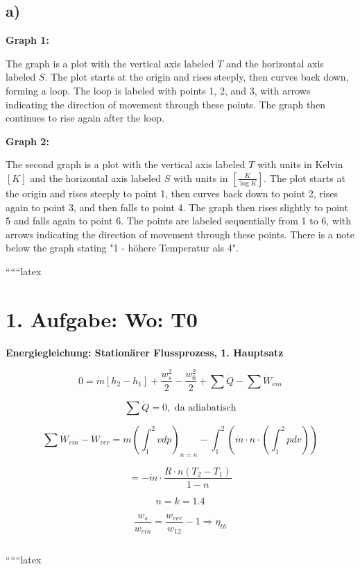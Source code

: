 

\subsection*{a)}

\textbf{Graph 1:} 

The graph is a plot with the vertical axis labeled \( T \) and the horizontal axis labeled \( S \). The plot starts at the origin and rises steeply, then curves back down, forming a loop. The loop is labeled with points 1, 2, and 3, with arrows indicating the direction of movement through these points. The graph then continues to rise again after the loop.

\textbf{Graph 2:}

The second graph is a plot with the vertical axis labeled \( T \) with units in Kelvin \([K]\) and the horizontal axis labeled \( S \) with units in \(\left[\frac{K}{\log K}\right]\). The plot starts at the origin and rises steeply to point 1, then curves back down to point 2, rises again to point 3, and then falls to point 4. The graph then rises slightly to point 5 and falls again to point 6. The points are labeled sequentially from 1 to 6, with arrows indicating the direction of movement through these points. There is a note below the graph stating "1 - höhere Temperatur als 4".

``````latex


\section*{1. Aufgabe: Wo: T0}

\textbf{Energiegleichung: Stationärer Flussprozess, 1. Hauptsatz}

\[
0 = \dot{m} \left[ h_2 - h_1 \right] + \frac{w_s^2}{2} - \frac{w_6^2}{2} + \sum \dot{Q} - \sum \dot{W}_{ein}
\]

\[
\sum \dot{Q} = 0, \text{ da adiabatisch}
\]

\[
\sum \dot{W}_{ein} - \dot{W}_{ver} = \dot{m} \left( \int_{1}^{2} v dp \right)_{n=n} - \int_{1}^{2} \left( \dot{m} \cdot n \cdot \left( \int_{1}^{2} p dv \right) \right)
\]

\[
= - \dot{m} \cdot \frac{R \cdot n \left( T_2 - T_1 \right)}{1 - n}
\]

\[
n = k = 1.4
\]

\[
\frac{w_s}{w_{ein}} = \frac{w_{ver}}{w_{12}} - 1 \Rightarrow \eta_{th}
\]

\[
\boxed{}
\]

``````latex